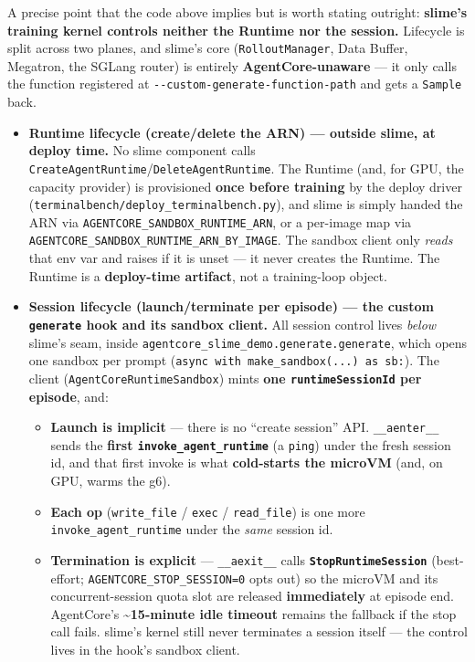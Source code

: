 \documentclass[
  paper=a4,
  ,captions=tableheading
]{scrartcl}
\providecommand{\tightlist}{%
  \setlength{\itemsep}{0pt}\setlength{\parskip}{0pt}}
\begin{document}
A precise point that the code above implies but is worth stating
outright: \textbf{slime's training kernel controls neither the Runtime
nor the session.} Lifecycle is split across two planes, and slime's core
(\texttt{RolloutManager}, Data Buffer, Megatron, the SGLang router) is
entirely \textbf{AgentCore-unaware} --- it only calls the function
registered at \texttt{-\/-custom-generate-function-path} and gets a
\texttt{Sample} back.

\begin{itemize}
\tightlist
\item
  \textbf{Runtime lifecycle (create/delete the ARN) --- outside slime,
  at deploy time.} No slime component calls
  \texttt{CreateAgentRuntime}/\texttt{DeleteAgentRuntime}. The Runtime
  (and, for GPU, the capacity provider) is provisioned \textbf{once
  before training} by the deploy driver
  (\texttt{terminalbench/deploy\_terminalbench.py}), and slime is simply
  handed the ARN via \texttt{AGENTCORE\_SANDBOX\_RUNTIME\_ARN}, or a
  per-image map via
  \texttt{AGENTCORE\_SANDBOX\_RUNTIME\_ARN\_BY\_IMAGE}. The sandbox
  client only \emph{reads} that env var and raises if it is unset --- it
  never creates the Runtime. The Runtime is a \textbf{deploy-time
  artifact}, not a training-loop object.
\item
  \textbf{Session lifecycle (launch/terminate per episode) --- the
  custom \texttt{generate} hook and its sandbox client.} All session
  control lives \emph{below} slime's seam, inside
  \texttt{agentcore\_slime\_demo.generate.generate}, which opens one
  sandbox per prompt
  (\texttt{async\ with\ make\_sandbox(...)\ as\ sb:}). The client
  (\texttt{AgentCoreRuntimeSandbox}) mints \textbf{one
  \texttt{runtimeSessionId} per episode}, and:

  \begin{itemize}
  \tightlist
  \item
    \textbf{Launch is implicit} --- there is no ``create session'' API.
    \texttt{\_\_aenter\_\_} sends the \textbf{first
    \texttt{invoke\_agent\_runtime}} (a \texttt{ping}) under the fresh
    session id, and that first invoke is what \textbf{cold-starts the
    microVM} (and, on GPU, warms the g6).
  \item
    \textbf{Each op} (\texttt{write\_file} / \texttt{exec} /
    \texttt{read\_file}) is one more \texttt{invoke\_agent\_runtime}
    under the \emph{same} session id.
  \item
    \textbf{Termination is explicit} --- \texttt{\_\_aexit\_\_} calls
    \textbf{\texttt{StopRuntimeSession}} (best-effort;
    \texttt{AGENTCORE\_STOP\_SESSION=0} opts out) so the microVM and its
    concurrent-session quota slot are released \textbf{immediately} at
    episode end. AgentCore's \textbf{\textasciitilde15-minute idle
    timeout} remains the fallback if the stop call fails. slime's kernel
    still never terminates a session itself --- the control lives in the
    hook's sandbox client.
  \end{itemize}
\end{itemize}
\end{document}
